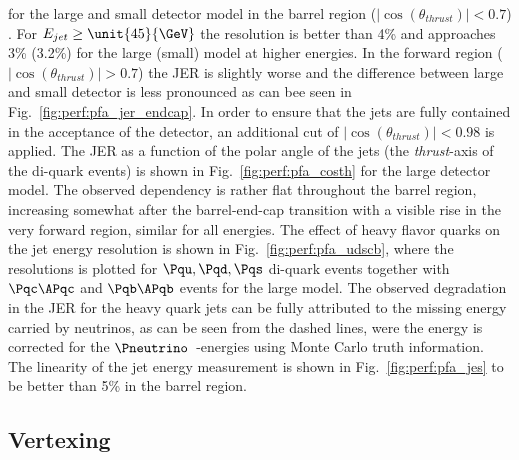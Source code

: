 for the large and small detector model in the barrel region ($|\cos(\theta_{thrust})|<0.7$) . For $E_{jet}\geq \unit{45}{\GeV}$ the resolution is better than 4\% and
approaches 3\% (3.2\%) for the large (small) model at higher energies. In the forward region ($|\cos(\theta_{thrust})|>0.7$) the JER is
slightly worse and the difference between large and small detector is less pronounced as can bee seen in Fig.~\ref{fig:perf:pfa_jer_endcap}. In order to
ensure that the jets are fully contained in the acceptance of the detector, an additional cut of  $|\cos(\theta_{thrust})|<0.98$ is applied.
The JER as a function of the polar angle of the jets (the {\em thrust}-axis of the di-quark events) is shown in Fig.~\ref{fig:perf:pfa_costh} for the
large detector model. The observed dependency is rather flat throughout the barrel region, increasing somewhat after the barrel-end-cap transition
with a visible rise in the very forward region, similar for all energies. The effect of heavy flavor quarks on the jet energy resolution is shown in
Fig.~\ref{fig:perf:pfa_udscb}, where the resolutions is plotted for $\Pqu,\Pqd,\Pqs$ di-quark events together with $\Pqc\APqc$ and $\Pqb\APqb$ events for the large model.
The observed degradation in the JER for the heavy quark jets can be fully attributed to the missing energy carried by neutrinos,
as can be seen from the dashed lines, were the energy is corrected for the $\Pneutrino$~-energies using Monte Carlo truth information.
The linearity of the jet energy measurement is shown in Fig.~\ref{fig:perf:pfa_jes} to be better than 5\% in the barrel region.


\subsection{Vertexing}


